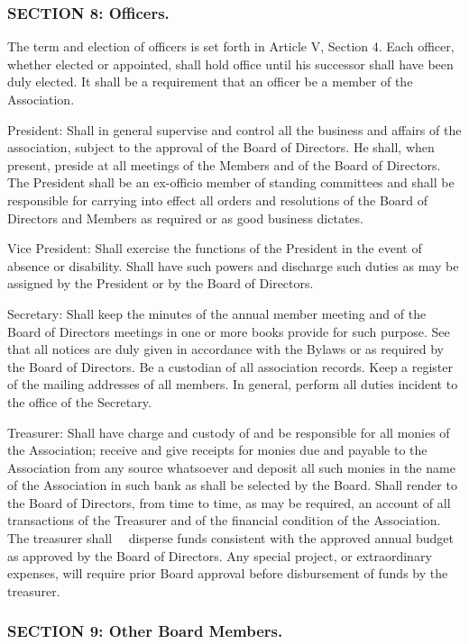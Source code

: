 \subsubsection{SECTION 8: Officers.}
The term and election of officers is set forth in Article V, Section
4. Each officer, whether elected or appointed, shall hold office until
his successor shall have been duly elected. It shall be a requirement
that an officer be a member of the Association.

President:  Shall in general supervise and control all the business
and affairs of the association, subject to the approval of the Board of
Directors. He shall, when present, preside at all meetings of the Members
and of the Board of Directors. The President shall be an ex-officio
member of standing committees and shall be responsible for carrying into
effect all orders and resolutions of the Board of Directors and Members
as required or as good business dictates.

Vice President: Shall exercise the functions of the President in the
event of absence or disability. Shall have such powers and discharge such
duties as may be assigned by the President or by the Board of Directors.

Secretary: Shall keep the minutes of the annual member meeting and of
the Board of Directors meetings in one or more books provide for such
purpose. See that all notices are duly given in accordance with the
Bylaws or as required by the Board of Directors. Be a custodian of
all association records. Keep a register of the mailing addresses of
all members. In general, perform all duties incident to the office of
the Secretary.

Treasurer: Shall have charge and custody of and be responsible for all
monies of the Association; receive and give receipts for monies due and
payable to the Association from any source whatsoever and deposit all such
monies in the name of the Association in such bank as shall be selected
by the Board. Shall render to the Board of Directors, from time to time,
as may be required, an account of all transactions of the Treasurer
and of the financial condition of the Association. The treasurer shall
   disperse funds consistent with the approved annual budget as
approved by the Board of Directors. Any special project, or extraordinary
expenses, will require prior Board approval before disbursement of funds
by the treasurer.

\subsubsection{SECTION 9: Other Board Members.}


